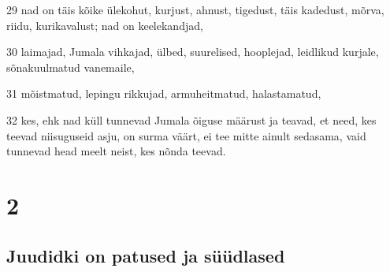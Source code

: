 \par 29 nad on täis kõike ülekohut, kurjust, ahnust, tigedust, täis kadedust, mõrva, riidu, kurikavalust; nad on keelekandjad,
\par 30 laimajad, Jumala vihkajad, ülbed, suurelised, hooplejad, leidlikud kurjale, sõnakuulmatud vanemaile,
\par 31 mõistmatud, lepingu rikkujad, armuheitmatud, halastamatud,
\par 32 kes, ehk nad küll tunnevad Jumala õiguse määrust ja teavad, et need, kes teevad niisuguseid asju, on surma väärt, ei tee mitte ainult sedasama, vaid tunnevad head meelt neist, kes nõnda teevad.


\chapter{2}

\section*{Juudidki on patused ja süüdlased}

